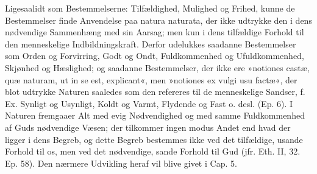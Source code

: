 \documentclass[12pt,a4paper]{book}
\newcommand{\opage}[1]{\marginnote{\footnotesize\textit{[#1]}}}
\begin{document}
Ligesaalidt som Bestemmelserne: Tilfældighed, Mulighed og
Frihed, kunne de Bestemmelser finde Anvendelse paa natura
naturata, der ikke udtrykke den i dens nødvendige Sammenhæng med
sin Aarsag; men kun i dens tilfældige Forhold til den
menneskelige Indbildningskraft. Derfor udelukkes saadanne
Bestemmelser som Orden og Forvirring, Godt og Ondt,
Fuldkommenhed og Ufuldkommenhed, Skjønhed og Hæslighed; og
saadanne Bestemmelser, der ikke ere »notiones castæ, quæ
naturam, ut in se est, explicant«, men »notiones ex vulgi usu
factæ«, der blot udtrykke Naturen saaledes som den refereres til
de menneskelige Sandser,
\opage{70} \setcounter{footnote}{0}%
f. Ex. Synligt og Usynligt, Koldt og Varmt, Flydende og Fast o.
desl. (Ep. 6). I Naturen fremgaaer Alt med evig Nødvendighed og
med samme Fuldkommenhed af Guds nødvendige Væsen; der tilkommer
ingen modus Andet end hvad der ligger i dens Begreb, og dette
Begreb bestemmes ikke ved det tilfældige, usande Forhold til os,
men ved det nødvendige, sande Forhold til Gud (jfr. Eth. II, 32.
Ep. 58). Den nærmere Udvikling heraf vil blive givet i Cap. 5.
\end{document}
